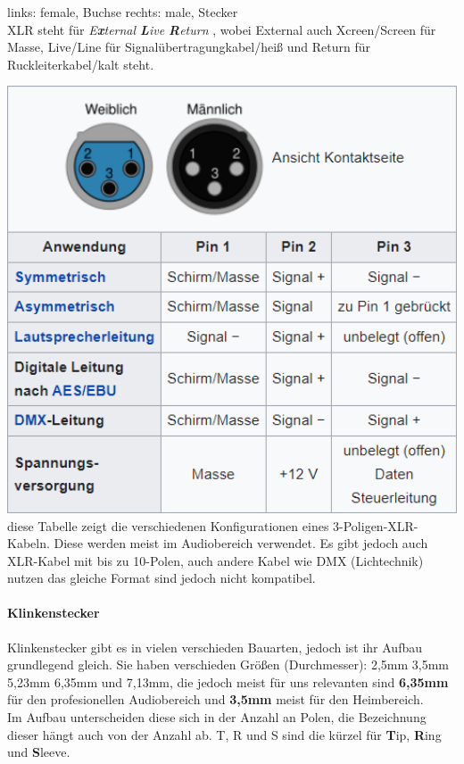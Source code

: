 links: female, Buchse rechts: male, Stecker\\

XLR steht für \textit{E\textbf{x}ternal \textbf{L}ive \textbf{R}eturn} \cite{AllesXLR:online}, wobei External auch Xcreen/Screen für Masse, Live/Line für Signalübertragungkabel/heiß und Return für Ruckleiterkabel/kalt steht.

\includegraphics[width=1\textwidth]{Bilder/Medientechnik/XLR-Tabelle.png} \cite{dewiki:241460075}
diese Tabelle zeigt die verschiedenen Konfigurationen eines 3-Poligen-XLR-Kabeln. Diese werden meist im Audiobereich verwendet. Es gibt jedoch auch XLR-Kabel mit bis zu 10-Polen, auch andere Kabel wie DMX (Lichtechnik) nutzen das gleiche Format sind jedoch nicht kompatibel.

\paragraph{Klinkenstecker}
Klinkenstecker gibt es in vielen verschieden Bauarten, jedoch ist ihr Aufbau grundlegend gleich. Sie haben verschieden Größen (Durchmesser): 2,5mm 3,5mm 5,23mm 6,35mm und 7,13mm, die jedoch meist für uns relevanten sind \textbf{6,35mm} für den profesionellen Audiobereich und \textbf{3,5mm} meist für den Heimbereich.\\
Im Aufbau unterscheiden diese sich in der Anzahl an Polen, die Bezeichnung dieser hängt auch von der Anzahl ab. T, R und S sind die kürzel für \textbf{T}ip, \textbf{R}ing und \textbf{S}leeve.\\

